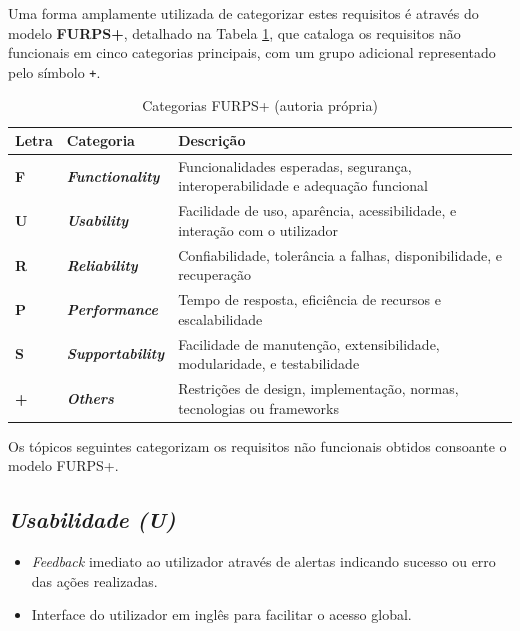 Uma forma amplamente utilizada de categorizar estes requisitos é através do modelo \textbf{FURPS+}, detalhado na Tabela \ref{tab:furps}, que cataloga os requisitos não funcionais em cinco categorias principais, com um grupo adicional representado pelo símbolo \texttt{+}.

\begin{table}[H]
    \centering
\begin{tabular}{|>{\bfseries}p{1cm}|>{\bfseries}p{2.5cm}|p{10cm}|}
    \hline
        Letra & Categoria & \textbf{Descrição} \\
            \hline
        F & \textit{Functionality} & Funcionalidades esperadas, segurança, interoperabilidade e adequação funcional \\
            \hline
        U & \textit{Usability} & Facilidade de uso, aparência, acessibilidade, e interação com o utilizador \\
            \hline
        R & \textit{Reliability} & Confiabilidade, tolerância a falhas, disponibilidade, e recuperação \\
            \hline
        P & \textit{Performance} & Tempo de resposta, eficiência de recursos e escalabilidade \\
            \hline
        S & \textit{Supportability} & Facilidade de manutenção, extensibilidade, modularidade, e testabilidade \\
            \hline
        + & \textit{Others} & Restrições de design, implementação, normas, tecnologias ou frameworks \\
            \hline
    \end{tabular}
    \caption{Categorias FURPS+ (autoria própria)}
    \label{tab:furps}
\end{table}

Os tópicos seguintes categorizam os requisitos não funcionais obtidos consoante o modelo FURPS+.

\subsection{\textit{Usabilidade (U)}}
\begin{itemize}
    \item \textit{Feedback} imediato ao utilizador através de alertas indicando sucesso ou erro das ações realizadas.
    \item Interface do utilizador em inglês para facilitar o acesso global.
\end{itemize}

